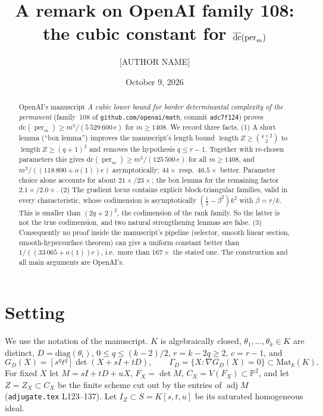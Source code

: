 \documentclass[11pt]{amsart}
\title{A remark on OpenAI family 108: the cubic constant for $\bdc(\per_m)$}
\author{[AUTHOR NAME]}
\date{October 9, 2026}
\theoremstyle{remark}
\DeclareMathOperator{\adj}{adj}
\DeclareMathOperator{\per}{per}
\DeclareMathOperator{\len}{length}
\newcommand{\bdc}{\overline{\mathrm{dc}}}
\begin{document}
\begin{abstract}
OpenAI's manuscript \emph{A cubic lower bound for border determinantal
complexity of the permanent} (family~108 of \texttt{github.com/openai/math},
commit \texttt{adc7f124}) proves $\bdc(\per_m)\ge m^3/(5\,529\,600\,e)$ for
$m\ge1408$. We record three facts.
(1) A short lemma (``box lemma'') improves the manuscript's length bound
$\len Z\ge\binom{q+2}2$ to $\len Z\ge(q+1)^2$ and removes the hypothesis
$q\le r-1$. Together with re-chosen parameters this gives
$\bdc(\per_m)\ge m^3/(125\,500\,e)$ for all $m\ge1408$, and
$m^3/((118\,800+o(1))e)$ asymptotically: $44\times$ resp.\ $46.5\times$
better. Parameter choice alone accounts for about $21\times$/$23\times$;
the box lemma for the remaining factor $2.1\times$/$2.0\times$.
(2) The gradient locus contains explicit block-triangular families, valid in
every characteristic, whose codimension is asymptotically
$(\tfrac12-\beta^2)k^2$ with $\beta=r/k$. This is smaller than
$(2q+2)^2$, the codimension of the rank family. So the latter is not the true
codimension, and two natural strengthening lemmas are false.
(3) Consequently no proof inside the manuscript's pipeline (selector, smooth
linear section, smooth-hypersurface theorem) can give a uniform constant
better than $1/((33\,065+o(1))e)$, i.e.\ more than $167\times$ the stated one.
The construction and all main arguments are OpenAI's.
\end{abstract}
\maketitle

\section{Setting}
We use the notation of the manuscript. $K$ is algebraically closed,
$\theta_1,\dots,\theta_k\in K$ are distinct, $D=\mathrm{diag}(\theta_i)$,
$0\le q\le (k-2)/2$, $r=k-2q\ge2$, $c=r-1$, and
\[
G_D(X)=[s^qt^q]\det(X+sI+tD),\qquad
\Gamma_D=\{X:\nabla G_D(X)=0\}\subset\mathrm{Mat}_k(K).
\]
For fixed $X$ let $M=sI+tD+uX$, $F_X=\det M$, $C_X=V(F_X)\subset\mathbb P^2$,
and let $Z=Z_X\subset C_X$ be the finite scheme cut out by the entries of
$\adj M$ (\texttt{adjugate.tex} L123--137). Let $I_Z\subset S=K[s,t,u]$ be its
saturated homogeneous ideal.
\end{document}
